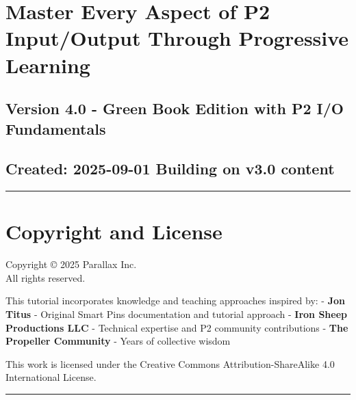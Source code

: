 \documentclass[11pt,a4paper,oneside,english]{book}
\begin{document}
\clearpage

\hypertarget{master-every-aspect-of-p2-inputoutput-through-progressive-learning}{%
\chapter{Master Every Aspect of P2 Input/Output Through Progressive
Learning}\label{master-every-aspect-of-p2-inputoutput-through-progressive-learning}}

\hypertarget{version-4.0---green-book-edition-with-p2-io-fundamentals}{%
\section{Version 4.0 - Green Book Edition with P2 I/O
Fundamentals}\label{version-4.0---green-book-edition-with-p2-io-fundamentals}}

\hypertarget{created-2025-09-01-building-on-v3.0-content}{%
\section{Created: 2025-09-01 \textbar{} Building on v3.0
content}\label{created-2025-09-01-building-on-v3.0-content}}

\begin{center}\rule{0.5\linewidth}{0.5pt}\end{center}

\clearpage

\hypertarget{copyright-and-license}{%
\chapter{Copyright and License}\label{copyright-and-license}}

Copyright © 2025 Parallax Inc.\\
All rights reserved.

This tutorial incorporates knowledge and teaching approaches inspired
by: - \textbf{Jon Titus} - Original Smart Pins documentation and
tutorial approach - \textbf{Iron Sheep Productions LLC} - Technical
expertise and P2 community contributions - \textbf{The Propeller
Community} - Years of collective wisdom

This work is licensed under the Creative Commons Attribution-ShareAlike
4.0 International License.

\begin{center}\rule{0.5\linewidth}{0.5pt}\end{center}
\end{document}

